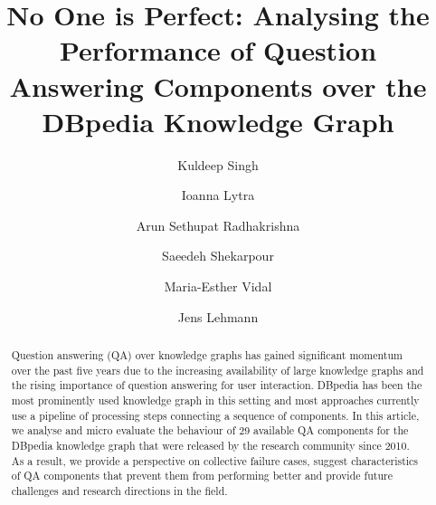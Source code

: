 \documentclass[sigconf,edbt]{acmart-edbt2019}
\begin{document}

\title{No One is Perfect: Analysing the Performance of Question Answering Components over the DBpedia Knowledge Graph}


\author{Kuldeep Singh}

\author{Ioanna Lytra}

\author{Arun Sethupat Radhakrishna}

\author{Saeedeh Shekarpour}

\author{Maria-Esther Vidal}

\author{Jens Lehmann}


\renewcommand{\shortauthors}{}

\begin{abstract}
Question answering (QA) over knowledge graphs has gained significant momentum over the past five years due to the increasing availability of large knowledge graphs and the rising importance of question answering for user interaction. 
DBpedia has been the most prominently used knowledge graph in this setting and most approaches currently use a pipeline of processing steps connecting a sequence of components.
In this article, we analyse and micro evaluate the behaviour of 29 available QA components for the DBpedia knowledge graph that were released by the research community since 2010. As a result, we provide a perspective on collective failure cases, suggest characteristics of QA components that prevent them from performing better and provide future challenges and research directions in the field. 
\end{abstract}

\maketitle
\end{document}
